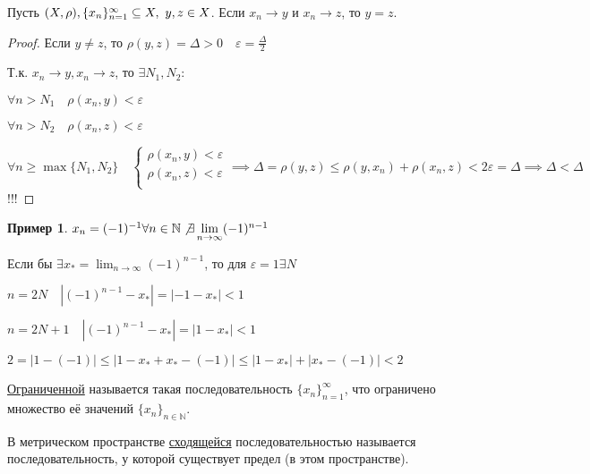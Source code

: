 \documentclass{book}
\newcommand\N{\ensuremath{\mathbb{N}}}
\theoremstyle{definition}
\newtheorem*{example}{Пример}
\begin{document}
    \begin{statement}
        Пусть $(X, \rho),\\
        \{x_n\}_{n=1}^{\infty }\subseteq X,\ y, z\in X $.
        Если $x_n\to y$ и $x_n\to z$, то $y=z$.
    \end{statement}
    \begin{proof}
        Если $y\neq z$, то $\rho(y,z) = \Delta>0\quad \varepsilon = \frac{\Delta}{2}$

        Т.к. $x_n \to y, x_{n} \to z$, то $\exists N_1, N_2:$

        $\forall n>N_1\quad \rho(x_n,y)<\varepsilon$

        $\forall n>N_2\quad \rho(x_n,z)<\varepsilon$

        $\forall n\geqslant \max\{N_1, N_2\}\quad 
        \begin{cases}
            \rho(x_{n} , y)<\varepsilon \\
            \rho(x_{n} , z)<\varepsilon\\
        \end{cases} \implies  \Delta = \rho(y,z) \leqslant  \rho(y, x_{n}) + \rho(x_{n} , z)<2\varepsilon = \Delta \implies \Delta<\Delta $ !!!
    \end{proof}
    \begin{example}
        $x_n = (-1)^{-1} \forall n\in \N  \not\exists \lim_{n \to \infty} (-1)^{n-1}$

        Если бы $\exists x_* = \lim_{n \to \infty} (-1)^{n-1}$, то для $\varepsilon = 1 \exists N$

        $n=2N\quad \left| (-1)^{n-1} - x_* \right| = |-1-x_*|<1 $

        $n=2N+1\quad \left| (-1)^{n-1} - x_* \right| = |1-x_*|<1 $

    $2 = |1 - (-1)|\leqslant |1-x_* + x_*-(-1)| \leqslant |1-x_*| + |x_* - (-1)| <2$
    \end{example}

    \begin{definition}
        \underline{Ограниченной} называется такая последовательность $\{x_n\}_{n=1}^{\infty}$, что ограничено множество её значений $\{x_n\}_{n\in \N}$. 
    \end{definition}

    \begin{definition}
        В метрическом пространстве \underline{сходящейся} последовательностью называется последовательность, у которой существует предел (в этом пространстве).
    \end{definition}
\end{document}
